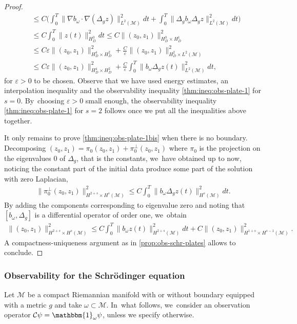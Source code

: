 \documentclass[JEP,XML,SOM,Unicode,published]{cedram}
\theoremstyle{definition}
\let\mc\mathcal
\let\veps\varepsilon
\newcommand{\M}{\mc{M}}
\providecommand{\norm}[1]{\lVert#1\rVert}
\begin{document}
\begin{proof}
\begin{align*}
&\leq C\biggl(\int_0^T \norm{\nabla b_\omega\cdot\nabla(\Delta_g z)}_{L^2(\M)}^2dt
+\int_0^T \norm{\Delta_g b_\omega\Delta_g z}_{L^2(\M)}^2dt\biggr)\\
&\leq C\int_0^T \norm{z(t)}_{H_D^3}^2dt \leq C\norm{(z_0, z_1)}_{H_D^3\times H_D^1}^2\\
&\leq C\veps \norm{(z_0, z_1)}_{H_D^4\times H_D^2}^2
+\frac{C}{\veps}\norm{(z_0, z_1)}_{H_D^2\times L^2(\M)}^2\\
&\leq C\veps \norm{(z_0, z_1)}_{H_D^4\times H_D^2}^2
+\frac{C}{\veps}\int_0^T \norm{b_\omega \Delta_g z(t)}_{L^2(\M)}^2 dt,
\end{align*}
for $\veps>0$ to be chosen. Observe that we have used energy estimates, an interpolation inequality and the observability inequality \eqref{thm:ineq:obs-plate-1} for $s=0$. By~choosing $\veps>0$ small enough, the observability inequality \eqref{thm:ineq:obs-plate-1} for $s=2$ follows once we put all the inequalities above together.

It only remains to prove \eqref{thm:ineq:obs-plate-1bis} when there is no boundary. Decomposing $(z_0,z_1)=\pi_0(z_0,z_1)+\pi_0^{\perp}(z_0,z_1)$ where $\pi_0$ is the projection on the eigenvalues $0$ of $\Delta_g$, that is the constants, we~have obtained up to now, noticing the constant part of the initial data produce some part of the solution with zero Laplacian,
\begin{align*}
\norm{\pi_0^{\perp}(z_0,z_1)}_{H^{2+s}\times H^s(\M)}^2\leq C\int_0^T \norm{b_\omega \Delta_g z(t)}_{H^s(\M)}^2 dt.
\end{align*}
By adding the components corresponding to eigenvalue zero and noting that $[b_{\omega},\Delta_g]$ is a differential operator of order one, we~obtain
\begin{align*}
\norm{(z_0,z_1)}_{H^{2+s}\times H^s(\M)}^2\leq C\int_0^T \norm{ b_\omega z(t)}_{H^{2+s}(\M)}^2 dt+C\norm{(z_0,z_1)}_{H^{1+s}\times H^{s-1}(\M)}^2.
\end{align*}
A compactness-uniqueness argument as in \cref{prop:obs-schr-plates} allows to conclude.
\end{proof}
\subsubsection{Observability for the Schrödinger equation}\label{sssec:obs-schr} Let $\M$ be a compact Riemannian manifold with or without boundary equipped with a metric $g$ and take $\omega\subset \M$. In~what follows, we~consider an observation operator $\mathcal{C}\psi=\mathbbm{1}_\omega \psi$, unless we specify otherwise.
\end{document}
